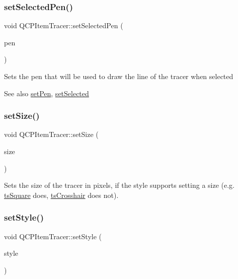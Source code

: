 \subsubsection{\texorpdfstring{set\+Selected\+Pen()}{setSelectedPen()}}
{\footnotesize\ttfamily void Q\+C\+P\+Item\+Tracer\+::set\+Selected\+Pen (\begin{DoxyParamCaption}\item[{const Q\+Pen \&}]{pen }\end{DoxyParamCaption})}

Sets the pen that will be used to draw the line of the tracer when selected

\begin{DoxySeeAlso}{See also}
\hyperlink{class_q_c_p_item_tracer_af8048636fc1ef0152e51809b008df2ca}{set\+Pen}, \hyperlink{class_q_c_p_abstract_item_a203de94ad586cc44d16c9565f49d3378}{set\+Selected} 
\end{DoxySeeAlso}
\mbox{\label{class_q_c_p_item_tracer_ae47fe0617f5fef5fdb766999569be10a}} 
\subsubsection{\texorpdfstring{set\+Size()}{setSize()}}
{\footnotesize\ttfamily void Q\+C\+P\+Item\+Tracer\+::set\+Size (\begin{DoxyParamCaption}\item[{double}]{size }\end{DoxyParamCaption})}

Sets the size of the tracer in pixels, if the style supports setting a size (e.\+g. \hyperlink{class_q_c_p_item_tracer_a2f05ddb13978036f902ca3ab47076500adf458a753354dc478e2d896a0260edcc}{ts\+Square} does, \hyperlink{class_q_c_p_item_tracer_a2f05ddb13978036f902ca3ab47076500afe1146977c53e62390e0d01cbc9b0d05}{ts\+Crosshair} does not). \mbox{\label{class_q_c_p_item_tracer_a41a2ac4f1acd7897b4e2a2579c03204e}} 
\subsubsection{\texorpdfstring{set\+Style()}{setStyle()}}
{\footnotesize\ttfamily void Q\+C\+P\+Item\+Tracer\+::set\+Style (\begin{DoxyParamCaption}\item[{\hyperlink{class_q_c_p_item_tracer_a2f05ddb13978036f902ca3ab47076500}{Q\+C\+P\+Item\+Tracer\+::\+Tracer\+Style}}]{style }\end{DoxyParamCaption})}

